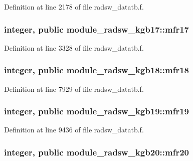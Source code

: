 Definition at line 2178 of file radsw\+\_\+datatb.\+f.

\subsubsection[{\texorpdfstring{mfr17}{mfr17}}]{\setlength{\rightskip}{0pt plus 5cm}integer, public module\+\_\+radsw\+\_\+kgb17\+::mfr17}\hypertarget{group__module__radsw__main_gadd099d7e1b5e7767d77de6d96673e26f}{}\label{group__module__radsw__main_gadd099d7e1b5e7767d77de6d96673e26f}


Definition at line 3328 of file radsw\+\_\+datatb.\+f.

\subsubsection[{\texorpdfstring{mfr18}{mfr18}}]{\setlength{\rightskip}{0pt plus 5cm}integer, public module\+\_\+radsw\+\_\+kgb18\+::mfr18}\hypertarget{group__module__radsw__main_ga9fa8140413e7ec769baea4f207e58393}{}\label{group__module__radsw__main_ga9fa8140413e7ec769baea4f207e58393}


Definition at line 7929 of file radsw\+\_\+datatb.\+f.

\subsubsection[{\texorpdfstring{mfr19}{mfr19}}]{\setlength{\rightskip}{0pt plus 5cm}integer, public module\+\_\+radsw\+\_\+kgb19\+::mfr19}\hypertarget{group__module__radsw__main_ga57f837ef4316dc2441bca3fde3998156}{}\label{group__module__radsw__main_ga57f837ef4316dc2441bca3fde3998156}


Definition at line 9436 of file radsw\+\_\+datatb.\+f.

\subsubsection[{\texorpdfstring{mfr20}{mfr20}}]{\setlength{\rightskip}{0pt plus 5cm}integer, public module\+\_\+radsw\+\_\+kgb20\+::mfr20}\hypertarget{group__module__radsw__main_ga9c7964eeb3acb4a11757fce977b73022}{}\label{group__module__radsw__main_ga9c7964eeb3acb4a11757fce977b73022}


